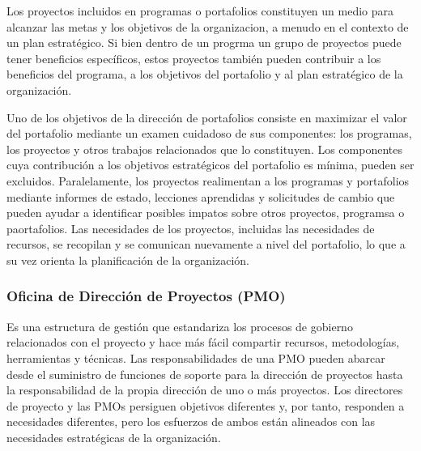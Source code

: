 Los proyectos incluidos en programas o portafolios constituyen un medio para alcanzar las metas y los objetivos de la organizacion, a menudo en el contexto de un plan estratégico. Si bien dentro de un progrma un grupo de proyectos puede tener beneficios específicos, estos proyectos también pueden contribuir a los beneficios del programa, a los objetivos del portafolio y al plan estratégico de la organización.

Uno de los objetivos de la dirección de portafolios consiste en maximizar el valor del portafolio mediante un examen cuidadoso de sus componentes: los programas, los proyectos y otros trabajos relacionados que lo constituyen. Los componentes cuya contribución a los objetivos estratégicos del portafolio es mínima, pueden ser excluidos. Paralelamente, los proyectos realimentan a los programas y portafolios mediante informes de estado, lecciones aprendidas y solicitudes de cambio que pueden ayudar a identificar posibles impatos sobre otros proyectos, programsa o paortafolios. Las necesidades de los proyectos, incluidas las necesidades de recursos, se recopilan y se comunican nuevamente a nivel del portafolio, lo que a su vez orienta la planificación de la organización.

\subsubsection{Oficina de Dirección de Proyectos (PMO)}

Es una estructura de gestión que estandariza los procesos de gobierno relacionados con el proyecto y hace más fácil compartir recursos, metodologías, herramientas y técnicas. Las responsabilidades de una PMO pueden abarcar desde el suministro de funciones de soporte para la dirección de proyectos hasta la responsabilidad de la propia dirección de uno o más proyectos. Los directores de proyecto y las PMOs persiguen objetivos diferentes y, por tanto, responden a necesidades diferentes, pero los esfuerzos de ambos están alineados con las necesidades estratégicas de la organización.

